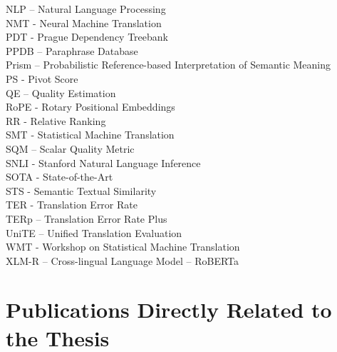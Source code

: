 \documentclass[12pt,a4paper]{report}
\begin{document}
NLP – Natural Language Processing \\
NMT - Neural Machine Translation \\
PDT - Prague Dependency Treebank \\
PPDB – Paraphrase Database \\
Prism – Probabilistic Reference-based Interpretation of Semantic Meaning \\
PS - Pivot Score \\
QE – Quality Estimation \\
RoPE - Rotary Positional Embeddings \\
RR - Relative Ranking \\
SMT - Statistical Machine Translation \\
SQM – Scalar Quality Metric \\
SNLI - Stanford Natural Language Inference \\
SOTA - State-of-the-Art \\
STS - Semantic Textual Similarity \\
TER - Translation Error Rate \\
TERp – Translation Error Rate Plus \\
UniTE – Unified Translation Evaluation \\
WMT - Workshop on Statistical Machine Translation \\
XLM-R – Cross-lingual Language Model – RoBERTa \\


\section*{Publications Directly Related to the Thesis}
\end{document}
